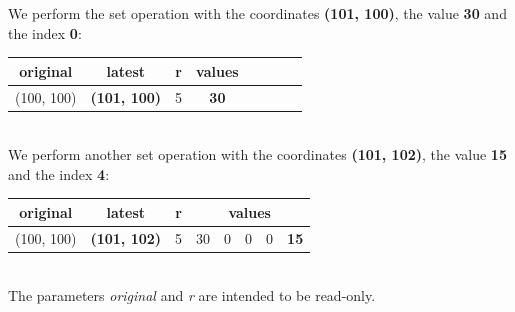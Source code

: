 \documentclass[a4paper,12pt,oneside]{book}
\begin{document}
\begin{onehalfspace}
    	We perform the set operation with the coordinates \textbf{(101, 100)}, the value \textbf{30} and the index \textbf{0}:
    	\begin{table}[!htbp]
            \centering
            \begin{tabular}{*8c}
            \toprule
           \textbf{original} & \textbf{latest} & \textbf{r} & \textbf{values}\\
            \midrule
            (100, 100) & \textbf{(101, 100)} & 5 & \textbf{30} \\
            \bottomrule
            \end{tabular}
        \end{table} \\ 
    	We perform another set operation with the coordinates \textbf{(101, 102)}, the value \textbf{15} and the index \textbf{4}:
    	\begin{table}[!htbp]
            \centering
            \begin{tabular}{*8c}
            \toprule
           \textbf{original} & \textbf{latest} & \textbf{r} &  \multicolumn{5}{c}{\textbf{values}}\\
            \midrule
            (100, 100) & \textbf{(101, 102)} & 5 & 30 & 0 & 0 & 0 & \textbf{15} \\
            \bottomrule
            \end{tabular}
        \end{table} \\
    	The parameters \textit{original} and \textit{r} are intended to be read-only.

\end{onehalfspace}
\end{document}

